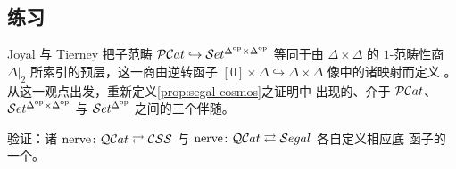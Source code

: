 \subsection*{练习}

\begin{exercise}\label{ex:pcat-presheaves-quotient}
Joyal 与 Tierney 把子范畴 $\mathcal{P}\mathcal{C}at\hookrightarrow\mathcal{S}et^{\Delta^{\mathrm{op}}\times\Delta^{\mathrm{op}}}$ 等同于由 $\Delta\times\Delta$ 的 $1$-范畴性商
$\Delta\vert_{2}$ 所索引的预层\trCategory，这一商由逆转函子
$[0]\times\Delta\hookrightarrow\Delta\times\Delta$ 像中的诸映射而定义
\cite[5.4]{bib64}。从这一观点出发，重新定义\cref{prop:segal-cosmos}之证明中
出现的、介于 $\mathcal{P}\mathcal{C}at$、$\mathcal{S}et^{\Delta^{\mathrm{op}}\times\Delta^{\mathrm{op}}}$
与 $\mathcal{S}et^{\Delta^{\mathrm{op}}}$ 之间的三个伴随。
\end{exercise}

\begin{exercise}\label{ex:nerve-sections}
验证：诸\trCosmologicalBiequivalence{} $\mathrm{nerve}\colon\mathcal{Q}\mathcal{C}at\rightleftarrows\mathcal{C}\mathcal{S}\mathcal{S}$
与 $\mathrm{nerve}\colon\mathcal{Q}\mathcal{C}at\rightleftarrows\mathcal{S}egal$ 各自定义相应底%
\trQuasiCategory{}函子的一个\trSection。
\end{exercise}

